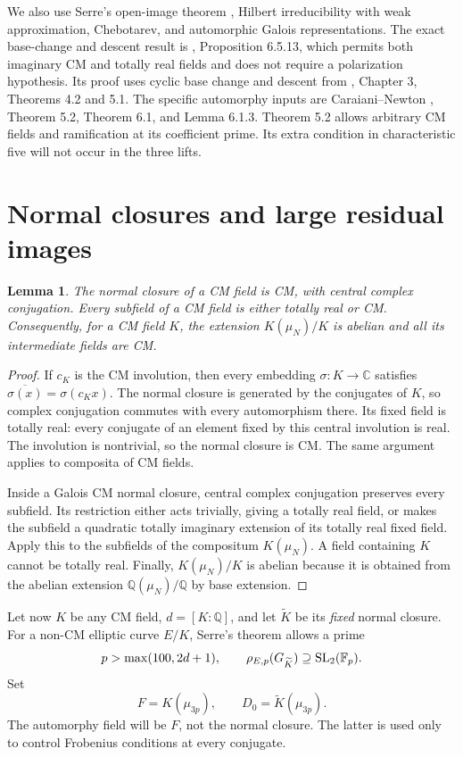 \documentclass[11pt,a4paper]{article}
\newtheorem{lemma}[theorem]{Lemma}
\theoremstyle{definition}\newtheorem{definition}[theorem]{Definition}
\theoremstyle{remark}\newtheorem*{remark}{Remark}
\newcommand{\Q}{\mathbb Q}\newcommand{\Z}{\mathbb Z}
\newcommand{\C}{\mathbb C}\newcommand{\A}{\mathbb A}
\newcommand{\F}{\mathbb F}\newcommand{\OO}{\mathcal O}
\begin{document}
We also use Serre's open-image theorem \cite{Serre}, Hilbert irreducibility
with weak approximation, Chebotarev, and automorphic Galois representations.
The exact base-change and descent result is \cite{ACC}, Proposition 6.5.13,
which permits both imaginary CM and totally real fields and does not require
a polarization hypothesis. Its proof uses cyclic base change and descent
from \cite{AC}, Chapter 3, Theorems 4.2 and 5.1. The specific automorphy inputs
are Caraiani--Newton \cite{CN}, Theorem 5.2, Theorem 6.1, and Lemma 6.1.3.
Theorem 5.2 allows arbitrary CM fields and ramification at its coefficient
prime. Its extra condition in characteristic five will not occur in the three
lifts.

\section{Normal closures and large residual images}

\begin{lemma}\label{lem:cm}
The normal closure of a CM field is CM, with central complex conjugation.
Every subfield of a CM field is either totally real or CM. Consequently, for
a CM field \(K\), the extension \(K(\mu_N)/K\) is abelian and all its
intermediate fields are CM.
\end{lemma}
\begin{proof}
If \(c_K\) is the CM involution, then every embedding \(\sigma:K\to\C\)
satisfies \(\overline{\sigma(x)}=\sigma(c_Kx)\).
The normal closure is generated by the conjugates of \(K\), so complex
conjugation commutes with every automorphism there. Its fixed field is totally
real: every conjugate of an element fixed by this central involution is real.
The involution is nontrivial, so the normal closure is CM. The same argument
applies to composita of CM fields.

Inside a Galois CM normal closure, central complex conjugation preserves every
subfield. Its restriction either acts trivially, giving a totally real field,
or makes the subfield a quadratic totally imaginary extension of its totally
real fixed field. Apply this to the subfields of the compositum
\(K(\mu_N)\). A field containing \(K\) cannot be totally real. Finally,
\(K(\mu_N)/K\) is abelian because it is obtained from the abelian extension
\(\Q(\mu_N)/\Q\) by base extension.
\end{proof}

Let now \(K\) be any CM field, \(d=[K:\Q]\), and let \(\widetilde K\) be its
\emph{fixed} normal closure. For a non-CM elliptic curve \(E/K\), Serre's theorem
allows a prime
\[
 p>\max(100,2d+1),\qquad
 \rho_{E,p}(G_{\widetilde K})\supseteq\SL_2(\F_p).
\]
Set
\[
 F=K(\mu_{3p}),\qquad D_0=\widetilde K(\mu_{3p}).
\]
The automorphy field will be \(F\), not the normal closure. The latter is used
only to control Frobenius conditions at every conjugate.
\end{document}

